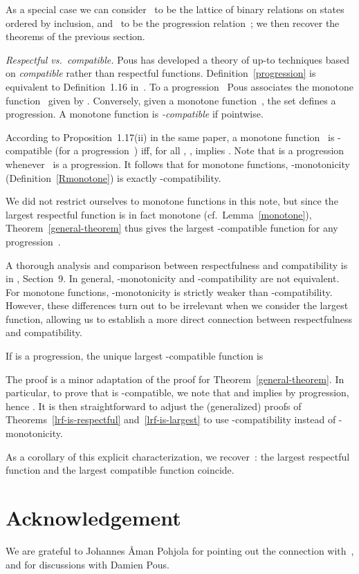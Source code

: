 \documentclass{CSML}
\theoremstyle{definition}
\begin{document}
As a special case we can consider~ to be the lattice of binary
relations on states ordered by inclusion, and~ to be the
progression relation~; we then recover the theorems of the
previous section.

\medskip

\noindent \emph{Respectful vs.\ compatible.}
Pous has developed a theory of up-to techniques based on
\emph{compatible} rather than respectful functions.
Definition~\ref{progression} is equivalent to Definition~1.16
in~\cite{Pous2007}.  To a progression~ Pous associates the monotone
function~ given by .
Conversely, given a monotone function~, the set
 defines a progression.  A monotone
function  is \emph{-compatible} if  pointwise.

According to Proposition~1.17(ii) in the same paper, a monotone
function~ is -compatible (for a progression~)
iff, for all , ,  implies .  Note
that  is a progression whenever~ is a
progression.  It follows that for monotone functions, -monotonicity
(Definition~\ref{Rmonotone}) is exactly -compatibility.

We did not restrict ourselves to monotone functions in this note, but
since the largest respectful function is in fact monotone
(cf.\ Lemma~\ref{monotone}), Theorem~\ref{general-theorem} thus gives
the largest -compatible function for any
progression~.

A thorough analysis and comparison between respectfulness and
compatibility is in \cite{Pous2016}, Section~9.  In general,
-monotonicity and -compatibility are not equivalent.  For
monotone functions, -monotonicity is strictly weaker than
-compatibility.  However, these differences turn out to be
irrelevant when we consider the largest function, allowing us to
establish a more direct connection between respectfulness and
compatibility.

\begin{thm}
\label{theorem-companion}
If  is a progression, the unique largest -compatible function
is

\end{thm}\smallskip

\noindent The proof is a minor adaptation of the proof for
Theorem~\ref{general-theorem}.  In particular, to prove that  is -compatible,
we note that  and  implies  by
progression, hence .  It is then straightforward to adjust the (generalized)
proofs of Theorems~\ref{lrf-is-respectful} and~\ref{lrf-is-largest} to
use -compatibility instead of -monotonicity.

As a corollary of this explicit characterization, we
recover~\cite[Proposition~9.1]{Pous2016}: the largest respectful
function and the largest compatible function coincide.

\section*{Acknowledgement}

\noindent We are grateful to Johannes \AA{}man Pohjola for pointing
out the connection with~\cite{Pous2007}, and for discussions with
Damien Pous.



\end{document}
